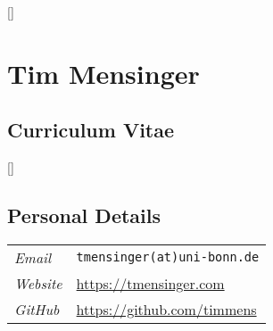 \documentclass[11pt]{article}
\begin{document}
\thispagestyle{empty}
\renewcommand\labelitemi{\tiny$\bullet$}

\titlespacing*{\section}{0pt}{0pt}{0pt}
\titlespacing*{\subsection}{0pt}{0pt}{0pt}

\titleformat{\section}{\normalfont\Large\bfseries}{\thesection}{1em}{}[{\titlerule[0.8pt]}]


\section*{\hfill \LARGE Tim Mensinger}\vspace*{3pt}
\subsection*{\hfill Curriculum Vitae}

\titleformat{\subsection}{\normalfont\bfseries}{\thesection}{1em}{}[{\titlerule[0.4pt]}]

\vspace{5pt}
\subsection*{Personal Details}

\begin{table}[h!]
    \renewcommand{\arraystretch}{1.4}
    \begin{tabular}{p{70pt} p{420pt}}
         \textit{Email} & \texttt{tmensinger(at)uni-bonn.de}\\
         \textit{Website} & \url{https://tmensinger.com}\\
         \textit{GitHub} & \url{https://github.com/timmens}
    \end{tabular}
\end{table}
\end{document}
